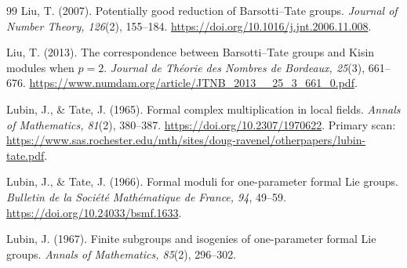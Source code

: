 \begin{thebibliography}{99}
Liu, T. (2007).
\newblock Potentially good reduction of Barsotti--Tate groups.
\newblock \emph{Journal of Number Theory, 126}(2), 155--184.
\newblock \url{https://doi.org/10.1016/j.jnt.2006.11.008}.

Liu, T. (2013).
\newblock The correspondence between Barsotti--Tate groups and Kisin modules
when $p=2$.
\newblock \emph{Journal de Th\'eorie des Nombres de Bordeaux, 25}(3), 661--676.
\newblock \url{https://www.numdam.org/article/JTNB_2013__25_3_661_0.pdf}.

Lubin, J., \& Tate, J. (1965).
\newblock Formal complex multiplication in local fields.
\newblock \emph{Annals of Mathematics, 81}(2), 380--387.
\newblock \url{https://doi.org/10.2307/1970622}.
\newblock Primary scan:
\url{https://www.sas.rochester.edu/mth/sites/doug-ravenel/otherpapers/lubin-tate.pdf}.

Lubin, J., \& Tate, J. (1966).
\newblock Formal moduli for one-parameter formal Lie groups.
\newblock \emph{Bulletin de la Soci\'et\'e Math\'ematique de France, 94}, 49--59.
\newblock \url{https://doi.org/10.24033/bsmf.1633}.


Lubin, J. (1967).
\newblock Finite subgroups and isogenies of one-parameter formal Lie groups.
\newblock \emph{Annals of Mathematics, 85}(2), 296--302.


\end{thebibliography}
